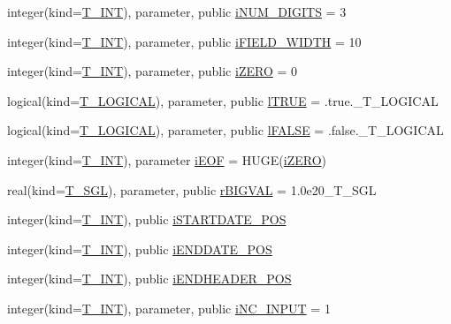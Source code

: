 \begin{DoxyCompactItemize}
\item 
integer(kind=\hyperlink{namespacetypes_a4e4d040a4425196c4d43be63e7e6103a}{T\_\-INT}), parameter, public \hyperlink{namespacetypes_a4255711de8681fefcdb67943aa2d812f}{iNUM\_\-DIGITS} = 3
\item 
integer(kind=\hyperlink{namespacetypes_a4e4d040a4425196c4d43be63e7e6103a}{T\_\-INT}), parameter, public \hyperlink{namespacetypes_ac00fb4e6602e3f1826af08a6bd5bc4e7}{iFIELD\_\-WIDTH} = 10
\item 
integer(kind=\hyperlink{namespacetypes_a4e4d040a4425196c4d43be63e7e6103a}{T\_\-INT}), parameter, public \hyperlink{namespacetypes_a694f00629aa7084d30ef27a0f233de5a}{iZERO} = 0
\item 
logical(kind=\hyperlink{namespacetypes_adfa8f4f6096bb7bdbb93f36b911dcaad}{T\_\-LOGICAL}), parameter, public \hyperlink{namespacetypes_a440f71bd0dd529ae3aaa8309171baa67}{lTRUE} = .true.\_\-T\_\-LOGICAL
\item 
logical(kind=\hyperlink{namespacetypes_adfa8f4f6096bb7bdbb93f36b911dcaad}{T\_\-LOGICAL}), parameter, public \hyperlink{namespacetypes_ad09a27b431e0fad201524039e6943e5b}{lFALSE} = .false.\_\-T\_\-LOGICAL
\item 
integer(kind=\hyperlink{namespacetypes_a4e4d040a4425196c4d43be63e7e6103a}{T\_\-INT}), parameter \hyperlink{namespacetypes_ad760d56012336a0edb070999d519902f}{iEOF} = HUGE(\hyperlink{namespacetypes_a694f00629aa7084d30ef27a0f233de5a}{iZERO})
\item 
real(kind=\hyperlink{namespacetypes_af3012489af4c138f271f1bce244b7e51}{T\_\-SGL}), parameter, public \hyperlink{namespacetypes_aa47fdce92f090579ada31ab06c3545ed}{rBIGVAL} = 1.0e20\_\-T\_\-SGL
\item 
integer(kind=\hyperlink{namespacetypes_a4e4d040a4425196c4d43be63e7e6103a}{T\_\-INT}), public \hyperlink{namespacetypes_a95d527e2c66739a080d7d76bb1ae6b97}{iSTARTDATE\_\-POS}
\item 
integer(kind=\hyperlink{namespacetypes_a4e4d040a4425196c4d43be63e7e6103a}{T\_\-INT}), public \hyperlink{namespacetypes_af25078a2a39ad338a062b8551e940824}{iENDDATE\_\-POS}
\item 
integer(kind=\hyperlink{namespacetypes_a4e4d040a4425196c4d43be63e7e6103a}{T\_\-INT}), public \hyperlink{namespacetypes_a9ab0a4f51d8fd66826d7d3079ecfdbc4}{iENDHEADER\_\-POS}
\item 
integer(kind=\hyperlink{namespacetypes_a4e4d040a4425196c4d43be63e7e6103a}{T\_\-INT}), parameter, public \hyperlink{namespacetypes_ae36ea9f0739802b729005e07be23b389}{iNC\_\-INPUT} = 1

\end{DoxyCompactItemize}

